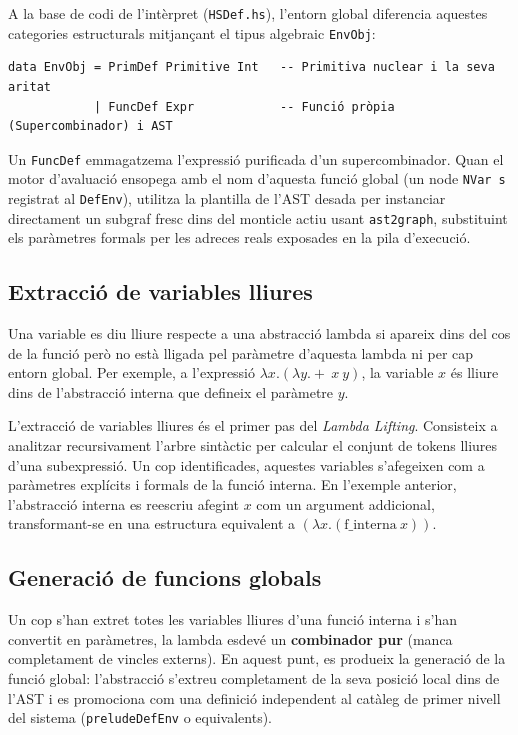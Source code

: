 A la base de codi de l'intèrpret (\texttt{HSDef.hs}), l'entorn global diferencia aquestes categories estructurals mitjançant el tipus algebraic \texttt{EnvObj}:

\begin{lstlisting}[style=haskellstyle, caption=Representació d'objectes de l'entorn global]
data EnvObj = PrimDef Primitive Int   -- Primitiva nuclear i la seva aritat
            | FuncDef Expr            -- Funció pròpia (Supercombinador) i AST
\end{lstlisting}

Un \texttt{FuncDef} emmagatzema l'expressió purificada d'un supercombinador. Quan el motor d'avaluació ensopega amb el nom d'aquesta funció global (un node \texttt{NVar s} registrat al \texttt{DefEnv}), utilitza la plantilla de l'AST desada per instanciar directament un subgraf fresc dins del monticle actiu usant \texttt{ast2graph}, substituint els paràmetres formals per les adreces reals exposades en la pila d'execució.

\subsection{Extracció de variables lliures}

Una variable es diu lliure respecte a una abstracció lambda si apareix dins del cos de la funció però no està lligada pel paràmetre d'aquesta lambda ni per cap entorn global. Per exemple, a l'expressió $\lambda x . (\lambda y . + \ x \ y)$, la variable $x$ és lliure dins de l'abstracció interna que defineix el paràmetre $y$. 

L'extracció de variables lliures és el primer pas del \textit{Lambda Lifting}. Consisteix a analitzar recursivament l'arbre sintàctic per calcular el conjunt de tokens lliures d'una subexpressió. Un cop identificades, aquestes variables s'afegeixen com a paràmetres explícits i formals de la funció interna. En l'exemple anterior, l'abstracció interna es reescriu afegint $x$ com un argument addicional, transformant-se en una estructura equivalent a $(\lambda x . (\text{f\_interna} \ x))$.

\subsection{Generació de funcions globals}

Un cop s'han extret totes les variables lliures d'una funció interna i s'han convertit en paràmetres, la lambda esdevé un \textbf{combinador pur} (manca completament de vincles externs). En aquest punt, es produeix la generació de la funció global: l'abstracció s'extreu completament de la seva posició local dins de l'AST i es promociona com una definició independent al catàleg de primer nivell del sistema (\texttt{preludeDefEnv} o equivalents). 

